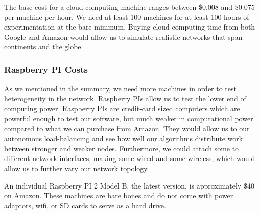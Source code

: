 \documentclass[12pt,a4paper]{article}
\begin{document}
The base cost for a cloud computing machine ranges between \$0.008 and \$0.075 per machine per hour.
We need at least 100 machines for at least 100 hours of experimentation at the bare minimum.
Buying cloud computing time from both Google and Amazon would allow us to simulate realistic networks that span continents and the globe.




\subsubsection*{Raspberry PI Costs}
As we mentioned in the summary, we need more machines in order to test heterogeneity in the network.
Raspberry PIs allow us to test the lower end of computing power.
Raspberry PIs are credit-card sized computers which are powerful enough to test our software, but much weaker in computational power compared to what we can purchase from Amazon.
They would allow us to our autonomous load-balancing and see how well our algorithms distribute work between stronger and weaker nodes.
Furthermore, we could attach some to different network interfaces, making some wired and some wireless, which would allow us to further vary our network topology.

An individual Raspberry PI 2 Model B, the latest version, is approximately \$40 on Amazon.
These machines are bare bones and do not come with power adaptors, wifi, or SD cards to serve as a hard drive.
\end{document}
